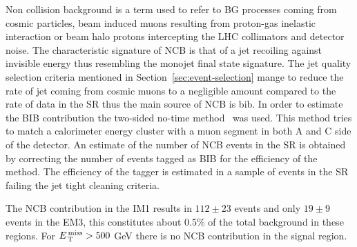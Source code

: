 Non collision background is a term used to refer to BG processes coming from
cosmic particles, beam induced muons resulting from proton-gas inelastic
interaction or beam halo protons intercepting the LHC collimators and detector
noise. The characteristic signature of NCB is that of a jet recoiling against
invisible energy thus resembling the monojet final state signature. The jet
quality selection criteria mentioned in Section~\ref{sec:event-selection} mange
to reduce the rate of jet coming from cosmic muons to a negligible amount
compared to the rate of data in the SR thus the main source of NCB is
\gls{bib}. In order to estimate the BIB contribution the two-sided no-time
method~\cite{BeamInducedBackground} was used. This method tries to match a
calorimeter energy cluster with a muon segment in both A and C side of the
detector. An estimate of the number of NCB events in the SR is obtained by
correcting the number of events tagged as BIB for the efficiency of the
method. The efficiency of the tagger is estimated in a sample of events in the
SR failing the jet tight cleaning criteria.

The NCB contribution in the IM1 results in $112 \pm 23$ events and only
$19 \pm 9$ events in the EM3, this constitutes about 0.5\% of the total
background in these regions. For $E_\mathrm{\, T}^\mathrm{\, miss} > 500~$GeV there is no NCB contribution
in the signal region.
